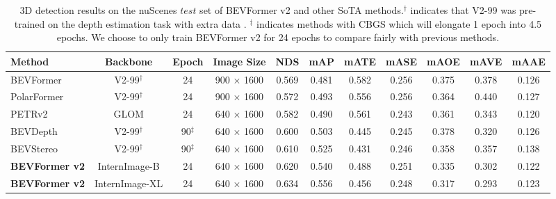 \documentclass[10pt,twocolumn,letterpaper]{article}
\begin{document}
\setlength{\tabcolsep}{3pt}
\setlength{\doublerulesep}{2\arrayrulewidth}
\renewcommand{\arraystretch}{1.1}
\begin{table*}[t]
    \caption{3D detection results on the nuScenes $test$ set of BEVFormer v2 and other SoTA methods.$^\dagger$ indicates that V2-99 \cite{Vovnet} was pre-trained on the depth estimation task with extra data \cite{DD3D}. $^\ddagger$ indicates methods with CBGS which will elongate 1 epoch into 4.5 epochs. We choose to only train BEVFormer v2 for 24 epochs to compare fairly with previous methods.}
    \label{table:sota_nuscenes}
    \centering

    \begin{tabular}{l|c|c|c|cc|ccccc}
        \toprule
        Method & Backbone & Epoch & Image Size & NDS & mAP & mATE & mASE & mAOE & mAVE & mAAE \\ 
        \midrule
        BEVFormer~\cite{bevformer} & V2-99$^\dagger$ & 24 & 900 $\times$ 1600 & 0.569 & 0.481 & 0.582 & 0.256 & 0.375 & 0.378 & 0.126 \\
        PolarFormer~\cite{polarformer} & V2-99$^\dagger$ & 24 & 900 $\times$ 1600 & 0.572 & 0.493 & 0.556 & 0.256 & 0.364 & 0.440 & 0.127 \\
        PETRv2~\cite{petrv2} & GLOM & 24 & 640 $\times$ 1600 & 0.582 & 0.490 & 0.561 & 0.243 & 0.361 & 0.343 & 0.120 \\
        BEVDepth~\cite{bevdepth} & V2-99$^\dagger$ & 90$^\ddagger$ & 640 $\times$ 1600 & 0.600 & 0.503 & 0.445 & 0.245 & 0.378 & 0.320 & 0.126 \\
        BEVStereo~\cite{bevstereo} & V2-99$^\dagger$ & 90$^\ddagger$ & 640 $\times$ 1600 & 0.610 & 0.525 & 0.431 & 0.246 & 0.358 & 0.357 & 0.138 \\
        \midrule
        \textbf{BEVFormer v2} & InternImage-B & 24 & 640 $\times$ 1600 & 0.620 & 0.540 & 0.488 & 0.251 & 0.335 & 0.302 & 0.122 \\
        \textbf{BEVFormer v2} & InternImage-XL & 24 & 640 $\times$ 1600 & 0.634 & 0.556 & 0.456 & 0.248 & 0.317 & 0.293 & 0.123 \\
        \bottomrule
    \end{tabular}

\end{table*} \setlength{\tabcolsep}{3pt}
\setlength{\doublerulesep}{2\arrayrulewidth}
\renewcommand{\arraystretch}{1.1}
\end{document}
